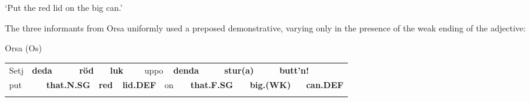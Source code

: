 \begin{styleTranslation}
‘Put the red lid on the big can.’

\end{styleTranslation}

\begin{styleBodyTextFirst}
The three informants from Orsa uniformly used a preposed demonstrative, varying only in the presence of the weak ending of the adjective: 

\end{styleBodyTextFirst}


\begin{listWWNumileveli}
\item {}

\begin{styleExample}
Orsa (Os)

\end{styleExample}

\end{listWWNumileveli}

\begin{tabular}{llllllllllllllll}
\lsptoprule
Setj & \multicolumn{2}{l}{{\bfseries deda}

} & \multicolumn{2}{l}{{\bfseries röd}

} & \multicolumn{2}{l}{{\bfseries luk}

} & \multicolumn{2}{l}{uppo

} & \multicolumn{2}{l}{{\bfseries denda}

} & \multicolumn{2}{l}{{\bfseries stur(a)}

} & \multicolumn{2}{l}{{\bfseries butt’n!}

} & \\
\multicolumn{2}{l}{put

} & \multicolumn{2}{l}{{\bfseries that.N.SG}

} & \multicolumn{2}{l}{{\bfseries red}

} & \multicolumn{2}{l}{{\bfseries lid.DEF}

} & \multicolumn{2}{l}{on

} & \multicolumn{2}{l}{{\bfseries that.F.SG}

} & \multicolumn{2}{l}{{\bfseries big.(WK)}

} & \multicolumn{2}{l}{{\bfseries can.DEF}

}\\
\lspbottomrule
\end{tabular}

